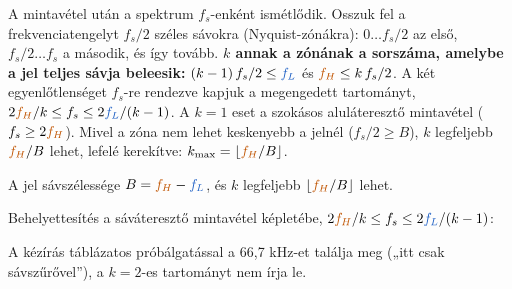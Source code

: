 A mintavétel után a spektrum $f_s$-enként ismétlődik. Osszuk fel a frekvenciatengelyt $f_s/2$ széles sávokra (Nyquist-zónákra): $0\ldots f_s/2$ az első, $f_s/2\ldots f_s$ a második, és így tovább. \textbf{$k$ annak a zónának a sorszáma, amelybe a jel teljes sávja beleesik:} $(k-1)\,f_s/2\le {\ca{f_L}}$ és ${\cb{f_H}}\le k\,f_s/2$. A két egyenlőtlenséget $f_s$-re rendezve kapjuk a megengedett tartományt, $2{\cb{f_H}}/k\le f_s\le2{\ca{f_L}}/(k-1)$. A $k=1$ eset a szokásos aluláteresztő mintavétel ($f_s\ge2{\cb{f_H}}$). Mivel a zóna nem lehet keskenyebb a jelnél ($f_s/2\ge B$), $k$ legfeljebb ${\cb{f_H}}/B$ lehet, lefelé kerekítve: $k_{\max}=\lfloor {\cb{f_H}}/B\rfloor$.

A jel sávszélessége $B={\cb{f_H}}-{\ca{f_L}}$, és $k$ legfeljebb $\lfloor {\cb{f_H}}/B\rfloor$ lehet.

\begin{center}\end{center}

Behelyettesítés a sáváteresztő mintavétel képletébe, $2{\cb{f_H}}/k\le f_s\le2{\ca{f_L}}/(k-1)$:

\begin{center}\end{center}

\begin{center}\end{center}
\begin{tipp}
A kézírás táblázatos próbálgatással a 66,7 kHz-et találja meg („itt csak sávszűrővel”), a $k=2$-es tartományt nem írja le.
\end{tipp}
\begin{eredmeny}

\begin{center}\end{center}
\end{eredmeny}


